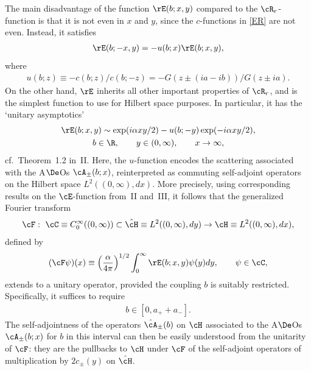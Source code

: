 \documentclass[pdftex]{sigma}
\numberwithin{equation}{section}
\begin{document}
The main disadvantage of the function $\rE(b;x,y)$ compared to the $\cR_r$-function is that it is not even in $x$ and $y$, since the $c$-functions in \eqref{ER} are not even. Instead, it satisf\/ies
\begin{gather}\label{Erefl}
\rE(b;-x,y)=-u(b;x)\rE(b;x,y),
\end{gather}
where
\begin{gather}\label{u}
u(b;z)\equiv -c(b;z)/c(b;-z)=-G(z\pm (ia-ib))/G(z\pm ia).
\end{gather}
On the other hand, $\rE$ inherits all other important properties of $\cR_r$, and is the simplest function to use for Hilbert space purposes. In particular, it has the `unitary asymptotics'
\begin{gather}\label{Eas}
\rE(b;x,y)\sim \exp(i\alpha xy/2)- u(b;-y)\exp(-i\alpha xy/2),\\
 b\in\R,\qquad y\in(0,\infty), \qquad x\to \infty,\nonumber
\end{gather}
cf.~Theorem~1.2 in~II. Here, the $u$-function
encodes the scattering associated with the A$\De$Os $\cA_{\pm}(b;x)$, reinterpreted as commuting self-adjoint operators on the Hilbert space $L^2((0,\infty),dx)$. More precisely, using corresponding results on the $\cE$-function from~II and~III, it follows that the generalized Fourier
transform
\begin{gather}\label{cF}
\cF
  : \ \cC\equiv C_0^{\infty}((0,\infty))\subset \hat{\cH}\equiv L^2((0,\infty),dy) \to\cH
\equiv L^2((0,\infty),dx),
\end{gather}
def\/ined by
\begin{gather}\label{cFE}
(\cF\psi)(x)\equiv\left(\frac{\alpha}{4\pi}\right)^{1/2}\int_0^{\infty}\rE(b;x,y)\psi(y)dy,\qquad
\psi\in\cC,
\end{gather}
extends to a unitary operator, provided the coupling $b$ is suitably restricted. Specif\/ically, it suf\/f\/ices to require
\begin{gather}\label{bres}
b\in [0,a_{+}+a_{-}].
\end{gather}
The self-adjointness of the operators $\hat{\cA}_{\pm}(b)$ on $\cH$ associated to the A$\De$Os $\cA_{\pm}(b;x)$ for $b$ in this interval can then be easily understood from the unitarity of $\cF$: they are the pullbacks to $\cH$ under $\cF$ of the self-adjoint operators of multiplication by $2c_{\pm}(y)$ on $\hat{\cH}$.
\end{document}

